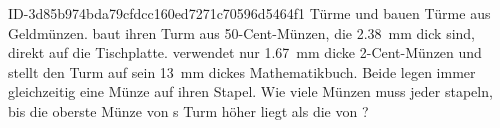 \begin{exercise}
      {ID-3d85b974bda79cfdcc160ed7271c70596d5464f1}
      {Türme}
  \ifproblem\problem
    \xxa{} und \xyb{} bauen Türme aus Geldmünzen. \xxa{} baut ihren Turm aus
    50-Cent-Münzen, die \SI{2.38}{\milli\metre} dick sind, direkt auf die
    Tischplatte. \xyb{} verwendet nur \SI{1.67}{\milli\metre} dicke 2-Cent-Münzen
    und stellt den Turm auf sein \SI{13}{\milli\metre} dickes Mathematikbuch.
    Beide legen immer gleichzeitig eine Münze auf ihren Stapel. Wie viele Münzen
    muss jeder stapeln, bis die oberste Münze von \xxa s Turm höher liegt als die
    von \xyb?
  \fi
\end{exercise}
